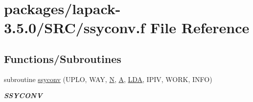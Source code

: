 \hypertarget{ssyconv_8f}{}\section{packages/lapack-\/3.5.0/\+S\+R\+C/ssyconv.f File Reference}
\label{ssyconv_8f}
\subsection*{Functions/\+Subroutines}
\begin{DoxyCompactItemize}
\item 
subroutine \hyperlink{group__realSYcomputational_ga1039a6477116ea45a3d8e6d5b883f396}{ssyconv} (U\+P\+L\+O, W\+A\+Y, \hyperlink{polmisc_8c_a0240ac851181b84ac374872dc5434ee4}{N}, \hyperlink{classA}{A}, \hyperlink{example__user_8c_ae946da542ce0db94dced19b2ecefd1aa}{L\+D\+A}, I\+P\+I\+V, W\+O\+R\+K, I\+N\+F\+O)
\begin{DoxyCompactList}\small\item\em {\bfseries S\+S\+Y\+C\+O\+N\+V} \end{DoxyCompactList}\end{DoxyCompactItemize}
